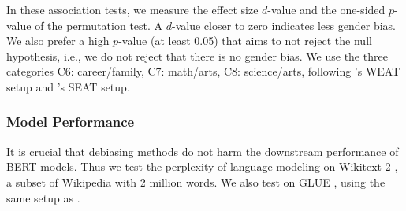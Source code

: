 %
In these association tests, we measure the effect size $d$-value and the
one-sided $p$-value of the permutation test.  A $d$-value closer to zero indicates less gender bias.  We also prefer a high $p$-value (at least 0.05) that aims to not reject the null hypothesis, i.e., we do not reject that there is no gender bias. We use the three categories C6: career/family, C7: math/arts, C8: science/arts, following 's WEAT setup and 's SEAT setup.

\subsubsection{Model Performance}
It is crucial that debiasing methods do not harm the downstream
performance of BERT models. Thus we test the perplexity of language modeling on Wikitext-2 \cite{merity2016pointer}, a subset of Wikipedia with 2 million words. We also test on GLUE  \cite{wang2018glue}, using the same setup as \cite{wolf2019huggingfaces}.%
